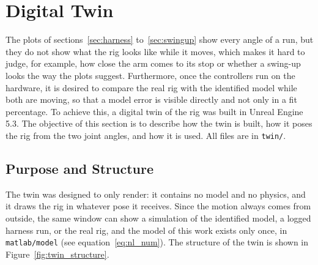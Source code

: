 \documentclass[a4paper,11pt]{article}
\begin{document}
\section{Digital Twin}
\label{sec:twin}
The plots of sections~\ref{sec:harness} to~\ref{sec:swingup} show every angle of a run, but they do not show what the rig looks like while it moves, which makes it hard to judge, for example, how close the arm comes to its stop or whether a swing-up looks the way the plots suggest. Furthermore, once the controllers run on the hardware, it is desired to compare the real rig with the identified model while both are moving, so that a model error is visible directly and not only in a fit percentage. To achieve this, a digital twin of the rig was built in Unreal Engine 5.3. The objective of this section is to describe how the twin is built, how it poses the rig from the two joint angles, and how it is used. All files are in \nolinkurl{twin/}.

\subsection{Purpose and Structure}
\label{sec:twin_structure}
The twin was designed to only render: it contains no model and no physics, and it draws the rig in whatever pose it receives. Since the motion always comes from outside, the same window can show a simulation of the identified model, a logged harness run, or the real rig, and the model of this work exists only once, in \nolinkurl{matlab/model} (see equation~\ref{eq:nl_num}). The structure of the twin is shown in Figure~\ref{fig:twin_structure}.
\end{document}
